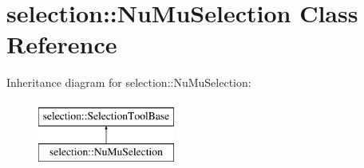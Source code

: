 \hypertarget{classselection_1_1NuMuSelection}{\section{selection\-:\-:Nu\-Mu\-Selection Class Reference}
\label{classselection_1_1NuMuSelection}
}
Inheritance diagram for selection\-:\-:Nu\-Mu\-Selection\-:\begin{figure}[H]
\begin{center}
\leavevmode
\includegraphics[height=2.000000cm]{classselection_1_1NuMuSelection}
\end{center}
\end{figure}
